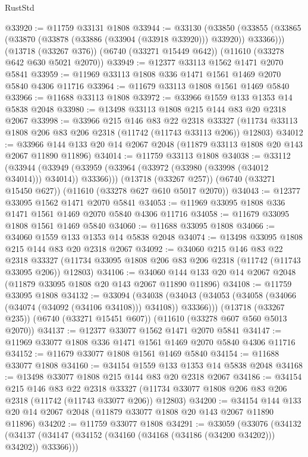 \begin{lexlean}{RustStd}
\begin{coremodule}
@33920 := @11759 @33131 @1808
@33944 := @33130
    (@33850 (@33855 (@33865 (@33870 (@33878 (@33886 (@33904 (@33918 @33920))) @33920)) @33366)))
    (@13718 (@33267 @376))
    (@6740 (@33271 @15449 @642))
    (@11610 (@33278 @642 @630 @5021 @2070))
@33949 := @12377 @33113 @1562 @1471 @2070 @5841
@33959 := @11969 @33113 @1808 @336 @1471 @1561 @1469 @2070 @5840 @4306 @11716
@33964 := @11679 @33113 @1808 @1561 @1469 @5840
@33966 := @11688 @33113 @1808
@33972 := @33966 @1559 @133 @1353 @14 @5838 @2048
@33980 := @13498 @33113 @1808 @215 @144 @83 @20 @2318 @2067
@33998 := @33966
    @215
    @146
    @83
    @22
    @2318
    @33327
    (@11734 @33113 @1808 @206 @83 @206 @2318 (@11742 (@11743 @33113 @206)) @12803)
@34012 := @33966 @144 @133 @20 @14 @2067 @2048 (@11879 @33113 @1808 @20 @143 @2067 @11890 @11896)
@34014 := @11759 @33113 @1808
@34038 := @33112
    (@33944 (@33949 (@33959 (@33964 (@33972 (@33980 (@33998 (@34012 @34014))) @34014)) @33366)))
    (@13718 (@33267 @257))
    (@6740 (@33271 @15450 @627))
    (@11610 (@33278 @627 @610 @5017 @2070))
@34043 := @12377 @33095 @1562 @1471 @2070 @5841
@34053 := @11969 @33095 @1808 @336 @1471 @1561 @1469 @2070 @5840 @4306 @11716
@34058 := @11679 @33095 @1808 @1561 @1469 @5840
@34060 := @11688 @33095 @1808
@34066 := @34060 @1559 @133 @1353 @14 @5838 @2048
@34074 := @13498 @33095 @1808 @215 @144 @83 @20 @2318 @2067
@34092 := @34060
    @215
    @146
    @83
    @22
    @2318
    @33327
    (@11734 @33095 @1808 @206 @83 @206 @2318 (@11742 (@11743 @33095 @206)) @12803)
@34106 := @34060 @144 @133 @20 @14 @2067 @2048 (@11879 @33095 @1808 @20 @143 @2067 @11890 @11896)
@34108 := @11759 @33095 @1808
@34132 := @33094
    (@34038 (@34043 (@34053 (@34058 (@34066 (@34074 (@34092 (@34106 @34108))) @34108)) @33366)))
    (@13718 (@33267 @235))
    (@6740 (@33271 @15451 @607))
    (@11610 (@33278 @607 @560 @5013 @2070))
@34137 := @12377 @33077 @1562 @1471 @2070 @5841
@34147 := @11969 @33077 @1808 @336 @1471 @1561 @1469 @2070 @5840 @4306 @11716
@34152 := @11679 @33077 @1808 @1561 @1469 @5840
@34154 := @11688 @33077 @1808
@34160 := @34154 @1559 @133 @1353 @14 @5838 @2048
@34168 := @13498 @33077 @1808 @215 @144 @83 @20 @2318 @2067
@34186 := @34154
    @215
    @146
    @83
    @22
    @2318
    @33327
    (@11734 @33077 @1808 @206 @83 @206 @2318 (@11742 (@11743 @33077 @206)) @12803)
@34200 := @34154 @144 @133 @20 @14 @2067 @2048 (@11879 @33077 @1808 @20 @143 @2067 @11890 @11896)
@34202 := @11759 @33077 @1808
@34291 := @33059
    (@33076
      (@34132 (@34137 (@34147 (@34152 (@34160 (@34168 (@34186 (@34200 @34202))) @34202)) @33366)))

\end{coremodule}
\end{lexlean}

